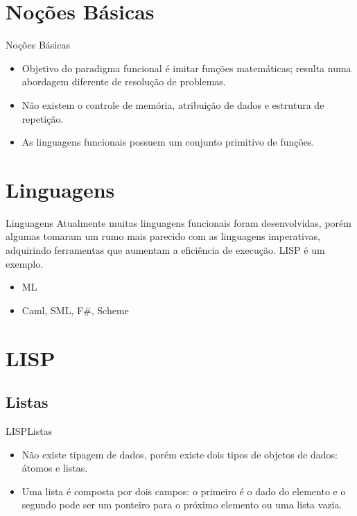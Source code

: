 \documentclass[12pt]{beamer} %
\begin{document}
\section{Noções Básicas}

\begin{frame}{Noções Básicas}
	\begin{itemize}
	\setlength\itemsep{1.5em}
		\item Objetivo do paradigma funcional é imitar funções matemáticas; resulta numa abordagem diferente de resolução de problemas.

		\item Não existem o controle de memória, atribuição de dados e estrutura de repetição.

		\item As linguagens funcionais possuem um conjunto primitivo de funções.
	\end{itemize}
\end{frame}

\section{Linguagens}

\begin{frame}{Linguagens}
	Atualmente muitas linguagens funcionais foram desenvolvidas, porém algumas tomaram um rumo mais parecido com as linguagens imperativas, adquirindo ferramentas que aumentam a eficiência de execução. LISP é um exemplo.\\[\baselineskip]

	\begin{itemize}
		\item ML

		\item Caml, SML, F\#, Scheme
	\end{itemize}
\end{frame}

\section{LISP}

\subsection{Listas}

\begin{frame}{LISP}{Listas}
	\begin{itemize}
	\setlength\itemsep{1.5em}
		\item Não existe tipagem de dados, porém existe dois tipos de objetos de dados: átomos e listas.

		\item Uma lista é composta por dois campos: o primeiro é o dado do elemento e o segundo pode ser um ponteiro para o próximo elemento ou uma lista vazia.
	\end{itemize}
\end{frame}
\end{document}
